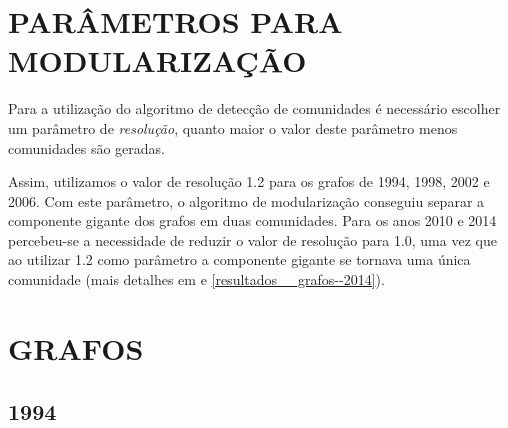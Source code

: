 \section{\texorpdfstring{\MakeUppercase{Parâmetros para modularização}}{}}
\label{resultados__parametros-modularizacao}

Para a utilização do algoritmo de detecção de comunidades é necessário escolher um parâmetro de \emph{resolução}, quanto maior o valor deste parâmetro menos comunidades são geradas.

Assim, utilizamos o valor de resolução 1.2 para os grafos de 1994, 1998, 2002 e 2006. Com este parâmetro, o algoritmo de modularização conseguiu separar a componente gigante dos grafos em duas comunidades. Para os anos 2010 e 2014 percebeu-se a necessidade de reduzir o valor de resolução para 1.0, uma vez que ao utilizar 1.2 como parâmetro a componente gigante se tornava uma única comunidade (mais detalhes em  e \ref{resultados__grafos--2014}).

\section{\texorpdfstring{\MakeUppercase{Grafos}}{}}
\label{resultados__grafos}


\subsection{1994}
\label{resultados__grafos--1994}

